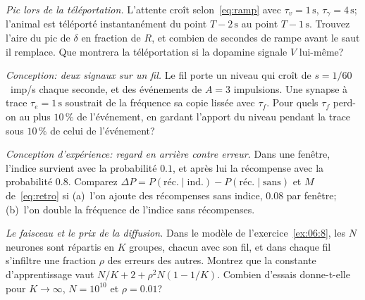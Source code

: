 \begin{exercise}[\lvlB]
\label{ex:07:5}
\emph{Pic lors de la téléportation.} L'attente croît selon~\eqref{eq:ramp} avec $\tau_v=1\,\text{s}$, $\tau_\gamma=4\,\text{s}$; l'animal est téléporté instantanément du point $T-2\,\text{s}$ au point $T-1\,\text{s}$. Trouvez l'aire du pic de $\delta$ en fraction de $R$, et combien de secondes de rampe avant le saut il remplace. Que montrera la téléportation si la dopamine signale $V$ lui-même?
\end{exercise}

\begin{exercise}[\lvlB]
\label{ex:07:6}
\emph{Conception: deux signaux sur un fil.} Le fil  porte un niveau qui croît de $s=1/60$~imp/s chaque seconde, et des événements de $A=3$ impulsions. Une synapse à trace $\tau_e=1\,\text{s}$ soustrait de la fréquence sa copie lissée avec $\tau_f$. Pour quels $\tau_f$ perd-on au plus $10\,\%$ de l'événement, en gardant l'apport du niveau pendant la trace sous $10\,\%$ de celui de l'événement?
\end{exercise}

\begin{exercise}[\lvlB]
\label{ex:07:7}
\emph{Conception d'expérience: regard en arrière contre erreur.} Dans une fenêtre, l'indice survient avec la probabilité $0.1$, et après lui la récompense avec la probabilité $0.8$. Comparez $\Delta P=P(\text{réc.}\mid\text{ind.})-P(\text{réc.}\mid\text{sans})$ et $M$ de~\eqref{eq:retro} si (a)~l'on ajoute des récompenses sans indice, $0.08$ par fenêtre; (b)~l'on double la fréquence de l'indice sans récompenses.
\end{exercise}

\begin{exercise}[\lvlC]
\label{ex:07:8}
\emph{Le faisceau et le prix de la diffusion.} Dans le modèle de l'exercice~\ref{ex:06:8}, les $N$ neurones sont répartis en $K$ groupes, chacun avec son fil, et dans chaque fil s'infiltre une fraction $\rho$ des erreurs des autres. Montrez que la constante d'apprentissage vaut $N/K+2+\rho^2N(1-1/K)$. Combien d'essais donne-t-elle pour $K\to\infty$, $N=10^{10}$ et $\rho=0.01$?
\end{exercise}
